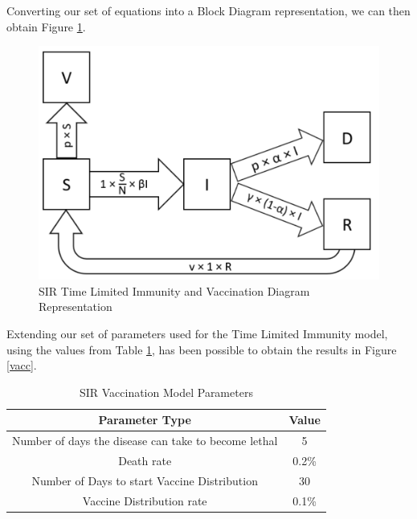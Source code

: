 Converting our set of equations into a Block Diagram representation, we can then obtain Figure \ref{dvacc}.

\begin{figure}[ht!]%
    \centering
    \includegraphics[width=0.7\linewidth]{latex/images/dvacc.pdf}
    \caption{SIR Time Limited Immunity and Vaccination Diagram Representation}
    \label{dvacc}
\end{figure}


Extending our set of parameters used for the Time Limited Immunity model, using the values from Table \ref{table:2}, has been possible to obtain the results in Figure \ref{vacc}.

{
\begin{table}[h!]
\centering
\begin{tabular}{|c|c|}
\hline
Parameter Type & Value \\
\hline
Number of days the disease can take to become lethal & 5  \\
Death rate & 0.2\%  \\
Number of Days to start Vaccine Distribution & 30  \\
Vaccine Distribution rate & 0.1\%  \\
\hline
\end{tabular}
\caption{SIR Vaccination Model Parameters}
\label{table:2}
\end{table}
}

